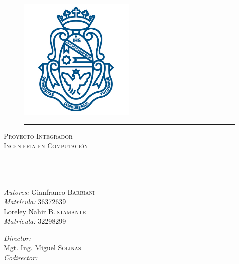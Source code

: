 \documentclass[11pt, oneside]{Thesis} %
\begin{document}
\begin{titlepage}
\begin{center}
\textsc{\LARGE \univname}\\[1.5cm] %


\begin{figure}[htbp]
	\centering
		\includegraphics[width=0.5\textwidth]{Figures/logo.png}
		\rule{35em}{0.5pt}
\end{figure}


\textsc{\Large Proyecto Integrador}\\[0.5cm] %
\textsc{\Large Ingeniería en Computación}\\[0.5cm] %

\HRule \\[0.4cm] %
{\huge \bfseries \ttitle}\\[0.4cm] %
\HRule \\[1cm] %
 
\begin{minipage}[t]{0.4\textwidth}
\begin{flushleft} \large
\emph{Autores:}{ Gianfranco \textsc{Barbiani}}\\ %
\emph{Matrícula: }{36372639}
\\{ Loreley Nahir \textsc{Bustamante}}\\ %
\emph{Matrícula: }{32298299}
\end{flushleft}
\end{minipage}
\begin{minipage}[t]{0.4\textwidth}
\begin{flushright} \large
\emph{Director:}\\{Mgt. Ing. Miguel \textsc{Solinas}} \\
\emph{Codirector:}\\{\supname}
\\~\\~\\ %
\end{flushright}
\end{minipage}


\end{center}
\end{titlepage}
\end{document}
